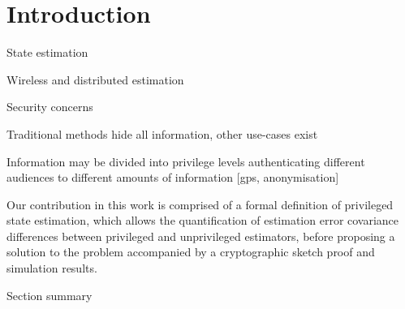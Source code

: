 \documentclass[conference]{IEEEtran}
\theoremstyle{definition}
\theoremstyle{definition}
\theoremstyle{remark}
\begin{document}

\IEEEpeerreviewmaketitle

% 
%                                                        
%                                                        
%                                                        
% 

\section{Introduction}
State estimation

Wireless and distributed estimation

Security concerns

Traditional methods hide all information, other use-cases exist

Information may be divided into privilege levels authenticating different audiences to different amounts of information [gps, anonymisation]

Our contribution in this work is comprised of a formal definition of privileged state estimation, which allows the quantification of estimation error covariance differences between privileged and unprivileged estimators, before proposing a solution to the problem accompanied by a cryptographic sketch proof and simulation results.

Section summary

% 
% 
\end{document}

